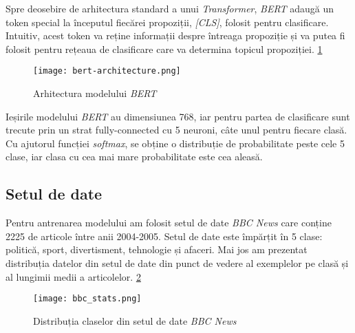 \par
Spre deosebire de arhitectura standard a unui \textit{Transformer}, \textit{BERT} adaugă un token
special la începutul fiecărei propoziții, \textit{[CLS]}, folosit pentru clasificare. Intuitiv,
acest token va reține informații despre întreaga propoziție și va putea fi folosit pentru rețeaua
de clasificare care va determina topicul propoziției. \ref{fig:bert-architecture}

\begin{figure}[h]
    \centering
    \texttt{[image: bert-architecture.png]}
    \caption{Arhitectura modelului \textit{BERT} \protect\footnotemark[2]}
    \label{fig:bert-architecture}
\end{figure}
\vspace{1em}

\par
Ieșirile modelului \textit{BERT} au dimensiunea 768, iar pentru partea de clasificare sunt trecute
prin un strat fully-connected cu 5 neuroni, câte unul pentru fiecare clasă. Cu ajutorul funcției
\textit{softmax}, se obține o distribuție de probabilitate peste cele 5 clase, iar clasa cu cea mai
mare probabilitate este cea aleasă.


\vspace{1em}

\subsection{Setul de date}
\vspace{1em}
Pentru antrenarea modelului am folosit setul de date \textit{BBC News} care conține 2225 de articole 
între anii 2004-2005. Setul de date este împărțit în 5 clase: politică, sport, divertisment, tehnologie
și afaceri. Mai jos am prezentat distribuția datelor din setul de date din punct de vedere al exemplelor
pe clasă și al lungimii medii a articolelor. \ref{fig:bbc-stats}

\vspace{1em}

\begin{figure}[h]
    \centering
    \texttt{[image: bbc\_stats.png]}
    \caption{Distribuția claselor din setul de date \textit{BBC News}}
    \label{fig:bbc-stats}
\end{figure}


